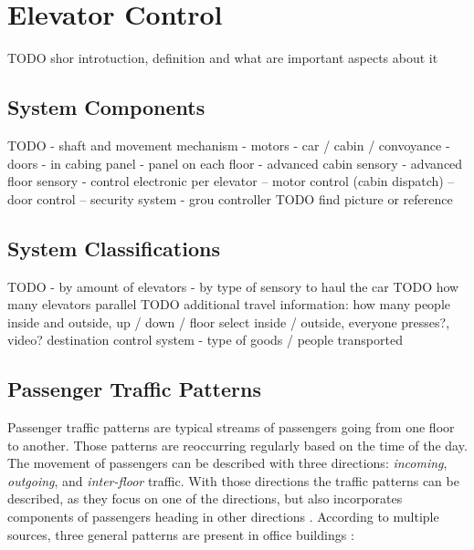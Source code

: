 \section{Elevator Control}
TODO shor introtuction, definition and what are important aspects about it

\subsection{System Components}
TODO
- shaft and movement mechanism
- motors
- car / cabin / convoyance
- doors
- in cabing panel
- panel on each floor
- advanced cabin sensory
- advanced floor sensory
- control electronic per elevator
-- motor control (cabin dispatch)
-- door control
-- security system
- grou controller
TODO find picture or reference

\autocite[][]{strobl1999controller}

\subsection{System Classifications}
TODO
- by amount of elevators
- by type of sensory to haul the car
TODO how many elevators parallel
TODO additional travel information: how many people inside and outside, up / down / floor select inside / outside, everyone presses?, video? 
destination control system
- type of goods / people transported \autocite[][p.~141]{unger2015aufzuege}

\subsection{Passenger Traffic Patterns}
Passenger traffic patterns are typical streams of passengers going from one floor to another.
Those patterns are reoccurring regularly based on the time of the day.
The movement of passengers can be described with three directions: \emph{incoming}, \emph{outgoing}, and \emph{inter-floor} traffic.
With those directions the traffic patterns can be described, as they focus on one of the directions, but also incorporates components of passengers heading in other directions \autocite[][p.~259]{siikonen1993simulation}.
According to multiple sources, three general patterns are present in office buildings \autocite[][pp.~1--2]{beers2015arrivals}
\autocite[][pp.~6--7]{axelsson2013strategies}
\autocite[][p.~194]{unger2015aufzuege}
\autocite[][p.~14]{siikonen1997models}:

